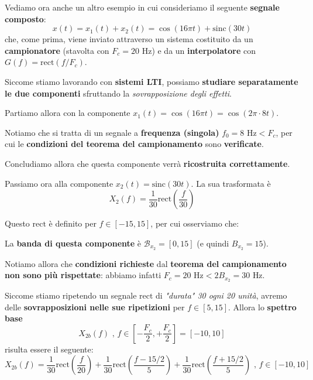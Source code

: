 Vediamo ora anche un altro esempio in cui consideriamo il seguente \textbf{segnale composto}:
\[
    x(t) = x_{1}(t) + x_{2}(t) = \cos (16\pi t) + \text{sinc}(30t)
\]
che, come prima, viene inviato attraverso un sistema costituito da un 
\textbf{campionatore} (stavolta con $F_c = 20 \text{ Hz}$) e da un \textbf{interpolatore} 
con $G(f) = \text{rect}(f /F_c)$.

Siccome stiamo lavorando con \textbf{sistemi LTI}, possiamo \textbf{studiare 
separatamente le due componenti} sfruttando la \textit{sovrapposizione degli effetti}. 

Partiamo allora con la componente $x_{1}(t) = \cos (16\pi t) = \cos (2\pi \cdot 8t)$. 

\begin{remark}
    Notiamo che si tratta di un segnale a \textbf{frequenza (singola)} 
    $f_{0}=8 \text{ Hz} < F_c$, per cui le \textbf{condizioni del teorema del campionamento} 
    sono \textbf{verificate}.
    
    Concludiamo allora che questa componente verrà \textbf{ricostruita correttamente}.
\end{remark}

Passiamo ora alla componente $x_{2}(t) = \text{sinc}(30t)$. La sua trasformata è
\[
    X_{2}(f) = \frac{1}{30} \text{rect} \left( \frac{f}{30} \right)
\]

Questo $\text{rect}$ è definito per $f\in[-15,15]$, per cui osserviamo che:

\begin{remark}
    La \textbf{banda di questa componente} è $\mathcal{B}_{x_{2}}=[0,15]$ 
    (e quindi $B_{x_{2}}=15$). 

    Notiamo allora che \textbf{condizioni richieste} dal 
    \textbf{teorema del campionamento non sono più rispettate}: abbiamo
    infatti $F_c = 20 \text{ Hz} < 2B_{x_{2}} = 30 \text{ Hz}$.
\end{remark}

Siccome stiamo ripetendo un segnale $\text{rect}$ di \textit{"durata" 30 ogni 20 unità},
avremo delle \textbf{sovrapposizioni nelle sue ripetizioni} per $f\in [5,15]$.
Allora lo \textbf{spettro base} 
\[
    X_{2b}(f) \text{ , } f\in \left[ -\frac{F_c}{2} , +\frac{F_c}{2} \right] = [-10,10] 
\]
risulta essere il seguente:
\[
    X_{2b}(f) = \frac{1}{30} \text{rect} \left( \frac{f}{20} \right) + 
    \frac{1}{30} \text{rect} \left( \frac{f-15/2}{5} \right) +
    \frac{1}{30} \text{rect} \left( \frac{f + 15/2}{5} \right) \text{ , }f\in[-10,10]
\]

